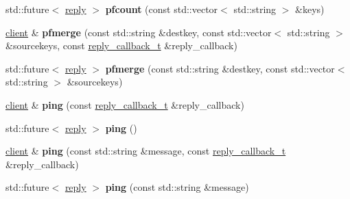 \begin{DoxyCompactItemize}
\item 
\mbox{\label{classcpp__redis_1_1client_ad357677011d10800e2595db129bfbfff}} 
std\+::future$<$ \mbox{\hyperlink{classcpp__redis_1_1reply}{reply}} $>$ {\bfseries pfcount} (const std\+::vector$<$ std\+::string $>$ \&keys)
\item 
\mbox{\label{classcpp__redis_1_1client_aad4f7f35b13e4d236d178ed47a499353}} 
\mbox{\hyperlink{classcpp__redis_1_1client}{client}} \& {\bfseries pfmerge} (const std\+::string \&destkey, const std\+::vector$<$ std\+::string $>$ \&sourcekeys, const \mbox{\hyperlink{classcpp__redis_1_1client_af7a65eb21aa25230bfbb0b0203c4fc04}{reply\+\_\+callback\+\_\+t}} \&reply\+\_\+callback)
\item 
\mbox{\label{classcpp__redis_1_1client_acfeb0b2a7adb65d9cb940d96b9d24478}} 
std\+::future$<$ \mbox{\hyperlink{classcpp__redis_1_1reply}{reply}} $>$ {\bfseries pfmerge} (const std\+::string \&destkey, const std\+::vector$<$ std\+::string $>$ \&sourcekeys)
\item 
\mbox{\label{classcpp__redis_1_1client_a19f0127614ca1369dcf739427079f7ec}} 
\mbox{\hyperlink{classcpp__redis_1_1client}{client}} \& {\bfseries ping} (const \mbox{\hyperlink{classcpp__redis_1_1client_af7a65eb21aa25230bfbb0b0203c4fc04}{reply\+\_\+callback\+\_\+t}} \&reply\+\_\+callback)
\item 
\mbox{\label{classcpp__redis_1_1client_a5273cf454284e04f4c43e1b391170009}} 
std\+::future$<$ \mbox{\hyperlink{classcpp__redis_1_1reply}{reply}} $>$ {\bfseries ping} ()
\item 
\mbox{\label{classcpp__redis_1_1client_a399c32f46d82d844b661647f64d9fb97}} 
\mbox{\hyperlink{classcpp__redis_1_1client}{client}} \& {\bfseries ping} (const std\+::string \&message, const \mbox{\hyperlink{classcpp__redis_1_1client_af7a65eb21aa25230bfbb0b0203c4fc04}{reply\+\_\+callback\+\_\+t}} \&reply\+\_\+callback)
\item 
\mbox{\label{classcpp__redis_1_1client_a5efa4ecc6b105a2464b22cd873caae39}} 
std\+::future$<$ \mbox{\hyperlink{classcpp__redis_1_1reply}{reply}} $>$ {\bfseries ping} (const std\+::string \&message)

\end{DoxyCompactItemize}
